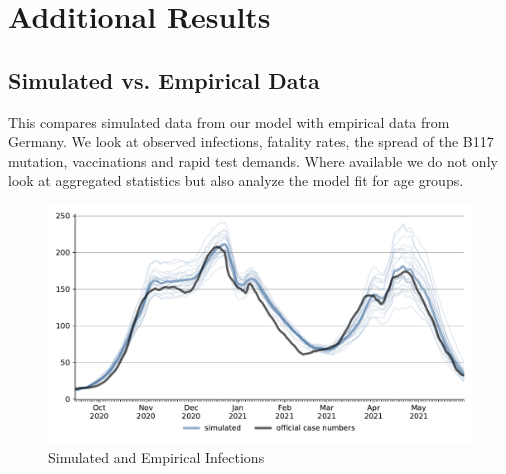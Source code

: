\section{Additional Results}
\label{sec:additional_results}

\subsection{Simulated vs. Empirical Data}
\label{subsec:new_cases_fit}

This compares simulated data from our model with empirical data from Germany. We look at
observed infections, fatality rates, the spread of the B117 mutation, vaccinations and
rapid test demands. Where available we do not only look at aggregated statistics but
also analyze the model fit for age groups.



\begin{figure}[ht]
  \centering
  \includegraphics[width=\textwidth]{../figures/results/figures/scenario_comparisons/combined_fit/full_new_known_case_with_single_runs}
  \caption{Simulated and Empirical Infections}
  \label{fig:aggregated_fit2}
\end{figure}


